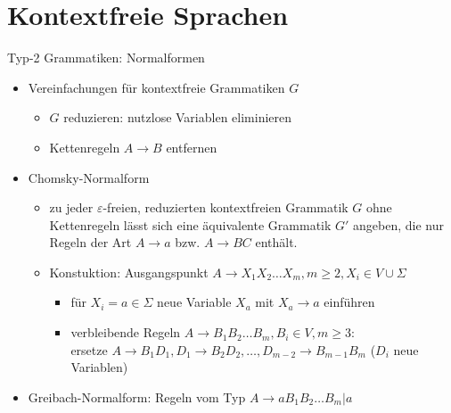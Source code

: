 \section{Kontextfreie Sprachen}

\begin{frame}{Typ-2 Grammatiken: Normalformen}
	\begin{itemize}
		\item Vereinfachungen für kontextfreie Grammatiken $G$
		\begin{itemize}
			\item $G$ reduzieren: nutzlose Variablen eliminieren
			\item Kettenregeln $A \rightarrow B$ entfernen
		\end{itemize}
		\item Chomsky-Normalform
		\begin{itemize}
			\item zu jeder $\varepsilon$-freien, reduzierten kontextfreien Grammatik $G$ ohne Kettenregeln lässt sich eine äquivalente Grammatik $G'$ angeben, die nur Regeln der Art $A \rightarrow a$ bzw. $A \rightarrow BC$ enthält.
			\item Konstuktion: Ausgangspunkt $A\rightarrow X_1X_2 \ldots X_m, m\geq 2, X_i \in V \cup \Sigma$
			\begin{itemize}
				\item für $X_i=a\in \Sigma$ neue Variable $X_a$ mit $X_a \rightarrow a$ einführen
				\item verbleibende Regeln $A \rightarrow B_1B_2\ldots B_m, B_i \in V, m\geq 3$:\\
				ersetze $A \rightarrow B_1D_1, D_1\rightarrow B_2D_2, \ldots, D_{m-2}\rightarrow B_{m-1}B_m$ ($D_i$ neue Variablen)
			\end{itemize}
		\end{itemize}
		\item Greibach-Normalform: Regeln vom Typ $A \rightarrow aB_1B_2 \ldots B_m|a$
	\end{itemize}
\end{frame}

